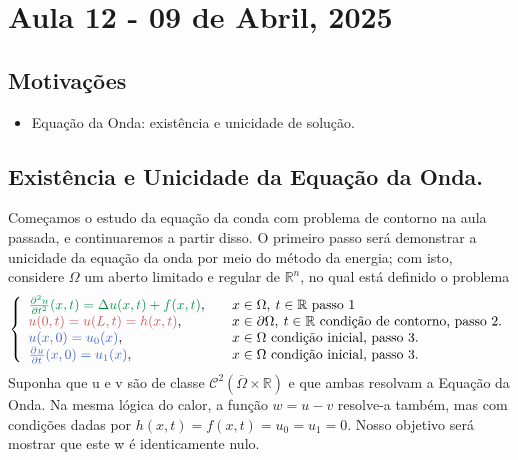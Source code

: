 \documentclass[../pde_notes.tex]{subfiles}
\begin{document}
\section{Aula 12 - 09 de Abril, 2025}
\subsection{Motivações}
\begin{itemize}
	\item Equação da Onda: existência e unicidade de solução.
\end{itemize}
\subsection{Existência e Unicidade da Equação da Onda.}

Começamos o estudo da equação da conda com problema de contorno na aula passada, e continuaremos a partir disso. O primeiro passo será demonstrar a unicidade da equação da onda por meio do método da energia; com isto, considere \(\Omega \) um aberto limitado e regular de \(\mathbb{R}^{n}\), no qual está definido o problema
\[
	\left\{\begin{array}{ll}
		{\color{SpringGreen4}\frac{\partial^{2}u}{\partial t^{2}}(x, t)=\Delta u(x, t) + f(x, t)}, & \quad x\in \Omega ,\: t\in \mathbb{R} \text{ passo 1}                                 \\
		{\color{IndianRed3}u(0, t) = u(L, t)=h(x, t)},                                             & \quad x\in \partial \Omega ,\: t\in \mathbb{R} \text{ condição de contorno, passo 2.} \\
		{\color{RoyalBlue3}u(x,0)=u_{0}(x)},                                                       & \quad  x\in \Omega      \text{ condição inicial, passo 3.}                            \\
		{\color{RoyalBlue3}\frac{\partial^{}u}{\partial t^{}}(x,0)=u_{1}(x)},                      & \quad  x\in \Omega \text{ condição inicial, passo 3.}
	\end{array}\right.
\]
Suponha que u e v são de classe \(\mathcal{C}^{2}(\overline{\Omega }\times \mathbb{R})\) e que ambas resolvam a {\color{SpringGreen4}Equação da Onda}. Na mesma lógica do calor, a função \(w=u-v\) resolve-a também, mas com condições dadas por \(h(x, t)=f(x, t)=u_{0}=u_{1}=0\). Nosso objetivo será mostrar que este w é identicamente nulo.
\end{document}
